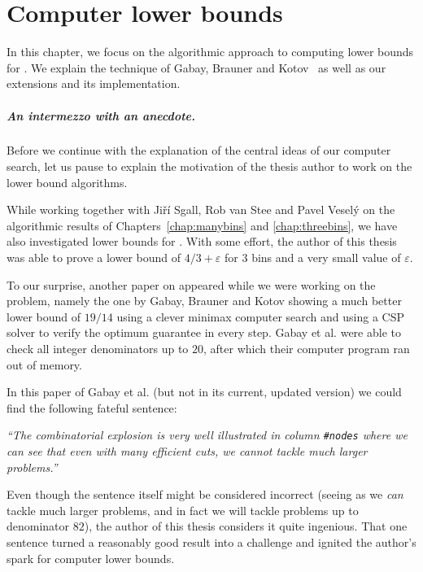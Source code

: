 \chapter{Computer lower bounds}\label{chap:lb}


In this chapter, we focus on the algorithmic approach to computing
lower bounds for \binstretch. We explain the technique of Gabay,
Brauner and Kotov~\cite{gabay2013lbv2} as well as our extensions and
its implementation.

\paragraph{An intermezzo with an anecdote.} Before we continue with
the explanation of the central ideas of our computer search, let us
pause to explain the motivation of the thesis author to work on the
lower bound algorithms.

While working together with Jiří Sgall, Rob van Stee and Pavel Veselý
on the algorithmic results of Chapters~\ref{chap:manybins} and
\ref{chap:threebins}, we have also investigated lower bounds for
\binstretch. With some effort, the author of this thesis was able to
prove a lower bound of $4/3 + \varepsilon$ for $3$ bins and a very
small value of $\varepsilon$.

To our surprise, another paper on \binstretch appeared while we were
working on the problem, namely the one by Gabay, Brauner and Kotov
\cite{gabay2013lbv2} showing a much better lower bound of $19/14$
using a clever minimax computer search and using a CSP solver to
verify the optimum guarantee in every step. Gabay et al. were able to
check all integer denominators up to $20$, after which their computer
program ran out of memory.

In this paper of Gabay et al. (but not in its current,
updated version) we could find the following fateful sentence:

\textit{``The combinatorial explosion is very well illustrated in column
\texttt{\#nodes} where we can see that even with many efficient cuts,
we cannot tackle much larger problems.''} \cite{gabay2013lbv2}

Even though the sentence itself might be considered incorrect (seeing
as we \emph{can} tackle much larger problems, and in fact we will
tackle problems up to denominator $82$), the author of this thesis
considers it quite ingenious. That one sentence turned a reasonably
good result into a challenge and ignited the author's spark for
computer lower bounds.
